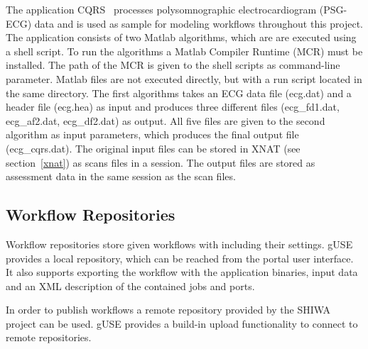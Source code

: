 The application CQRS~\cite{krefting10} processes polysomnographic electrocardiogram (PSG-ECG) data and is used as sample for modeling workflows throughout this project.
The application consists of two Matlab algorithms, which are are executed using a shell script.
To run the algorithms a Matlab Compiler Runtime (MCR) must be installed.
The path of the MCR is given to the shell scripts as command-line parameter.
Matlab files are not executed directly, but with a run script located in the same directory.
The first algorithms takes an ECG data file (ecg.dat) and a header file (ecg.hea) as input and produces three different files (ecg\_fd1.dat, ecg\_af2.dat, ecg\_df2.dat) as output.
All five files are given to the second algorithm as input parameters, which produces the final output file (ecg\_cqrs.dat).
The original input files can be stored in XNAT (see section~\ref{xnat}) as scans files in a session.
The output files are stored as assessment data in the same session as the scan files.

\subsection{Workflow Repositories}\label{repositories}

Workflow repositories store given workflows with including their settings.
gUSE provides a local repository, which can be reached from the portal user interface.
It also supports exporting the workflow with the application binaries, input data and an XML description of the contained jobs and ports.

In order to publish workflows a remote repository \cite{somnocqrs} provided by the SHIWA project can be used.
gUSE provides a build-in upload functionality to connect to remote repositories.